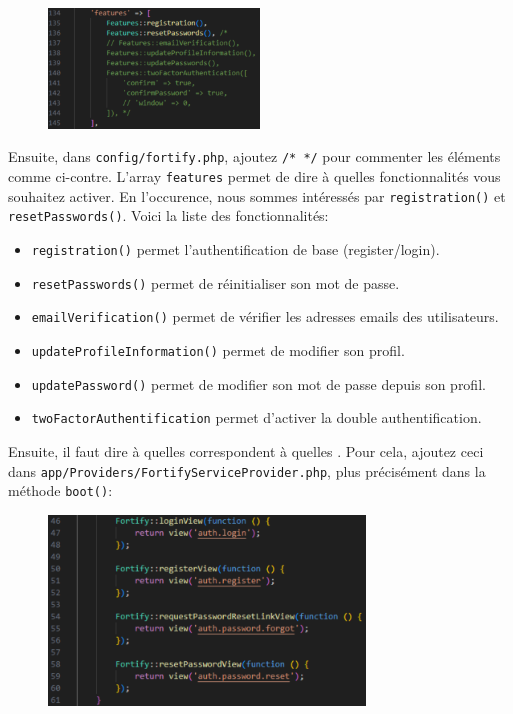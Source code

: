 \begin{figure}
    \vspace{-0.5cm}
    \includegraphics[width=0.5\textwidth]{figures-C1/config_fortify.pdf}
\end{figure}

Ensuite, dans \verb|config/fortify.php|, ajoutez \verb|/* */| pour commenter les éléments comme ci-contre. L'array \verb|features| permet de dire à \fortify{} quelles fonctionnalités vous souhaitez activer. En l'occurence, nous sommes intéressés par \verb|registration()| et \verb|resetPasswords()|. Voici la liste des fonctionnalités:

\begin{itemize}
    \item \verb|registration()| permet l'authentification de base (register/login).
    \item \verb|resetPasswords()| permet de réinitialiser son mot de passe.
\end{itemize}

\begin{itemize}[resume, before = \vspace*{-0.63cm}]
    \item \verb|emailVerification()| permet de vérifier les adresses emails des utilisateurs.
    \item \verb|updateProfileInformation()| permet de modifier son profil.
    \item \verb|updatePassword()| permet de modifier son mot de passe depuis son profil. 
    \item \verb|twoFactorAuthentification| permet d'activer la double authentification.
\end{itemize}

Ensuite, il faut dire à \fortify{} quelles \views{} correspondent à quelles \routes{}. Pour cela, ajoutez ceci dans \verb|app/Providers/FortifyServiceProvider.php|, plus précisément dans la méthode \verb|boot()|:

\begin{figure}[!h]
    \centering
    \includegraphics[width=0.75\textwidth]{figures-C1/fortify_provider.pdf}
    \caption{}
\end{figure}



